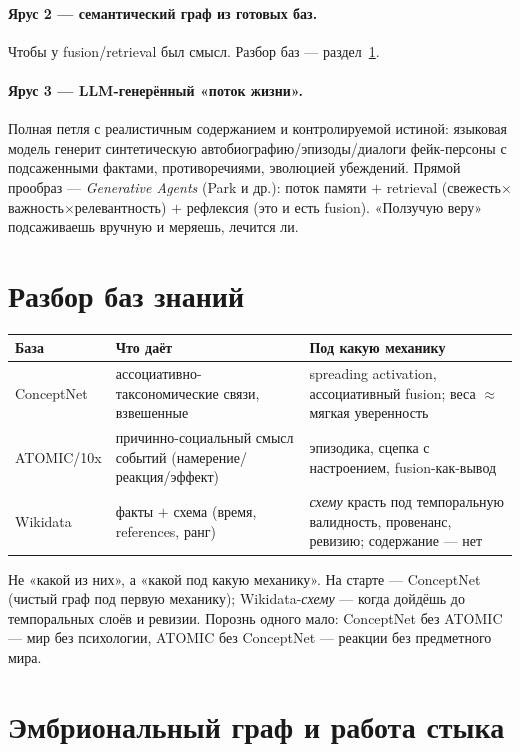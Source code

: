 \paragraph{Ярус 2 — семантический граф из готовых баз.} Чтобы у fusion/retrieval был
смысл. Разбор баз — раздел~\ref{sec:datasets}.

\paragraph{Ярус 3 — LLM-генерённый «поток жизни».} Полная петля с реалистичным
содержанием и контролируемой истиной: языковая модель генерит синтетическую
автобиографию/эпизоды/диалоги фейк-персоны с подсаженными фактами, противоречиями,
эволюцией убеждений. Прямой прообраз — \emph{Generative Agents} (Park и др.): поток
памяти $+$ retrieval (свежесть$\times$важность$\times$релевантность) $+$ рефлексия (это
и есть fusion). «Ползучую веру» подсаживаешь вручную и меряешь, лечится ли.

\section{Разбор баз знаний}
\label{sec:datasets}

\begin{center}
\begin{tabular}{p{} p{} p{}}
\toprule
\textbf{База} & \textbf{Что даёт} & \textbf{Под какую механику} \\
\midrule
ConceptNet & ассоциативно-таксономические связи, взвешенные & spreading activation,
ассоциативный fusion; веса $\approx$ мягкая уверенность \\
ATOMIC/10x & причинно-социальный смысл событий (намерение/реакция/эффект) &
эпизодика, сцепка с настроением, fusion-как-вывод \\
Wikidata & факты $+$ схема (время, references, ранг) & \emph{схему} красть под
темпоральную валидность, провенанс, ревизию; содержание — нет \\
\bottomrule
\end{tabular}
\end{center}

Не «какой из них», а «какой под какую механику». На старте — ConceptNet (чистый граф
под первую механику); Wikidata-\emph{схему} — когда дойдёшь до темпоральных слоёв и
ревизии. Порознь одного мало: ConceptNet без ATOMIC — мир без психологии, ATOMIC без
ConceptNet — реакции без предметного мира.

\section{Эмбриональный граф и работа стыка}

